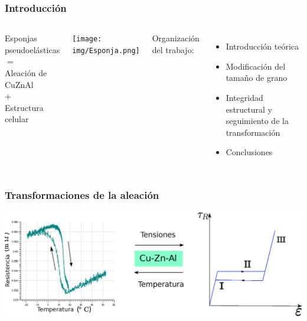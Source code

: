 \documentclass[usenames,dvipsnames]{beamer}
\begin{document}

\begin{frame}
\frametitle{Introducción}
\begin{columns}
\begin{block}{
Esponjas pseudoelásticas \\
\quad \quad \quad \quad $=$ \\
\quad Aleación de CuZnAl \\
\quad \quad \quad \quad $+$ \\
\quad Estructura celular}
\end{block}
\vfill
\begin{center}

\texttt{[image: img/Esponja.png]}
\end{center}

\begin{block}{
 Organización del trabajo:}
\end{block}
\begin{itemize}
 \item Introducción teórica
 \item Modificación del tamaño de grano
 \item Integridad estructural y seguimiento de la transformación
 \item Conclusiones
\end{itemize}

\end{columns}
\end{frame}


\begin{frame}

\frametitle{Transformaciones de la aleación}
 \includegraphics[width=\textwidth]{img/intro/Intro.eps}
\end{frame}
\end{document}
